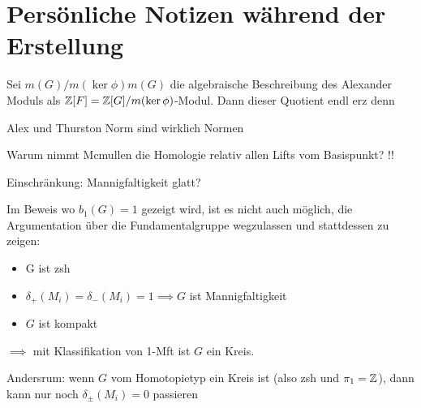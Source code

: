 
\section{Persönliche Notizen während der Erstellung}
	Sei $m(G)/m(\ker \phi)m(G)$ die algebraische Beschreibung des Alexander Moduls als $\mathbb{Z}[F]=\mathbb{Z}[G]/m(\ker \phi)$-Modul. Dann dieser Quotient endl erz denn

	Alex und Thurston Norm sind wirklich Normen 

	Warum nimmt Mcmullen die Homologie relativ allen Lifts vom Basispunkt?  !!

	Einschränkung: Mannigfaltigkeit glatt?

	Im Beweis wo $b_1(G)=1$ gezeigt wird, ist es nicht auch möglich, die Argumentation über die Fundamentalgruppe wegzulassen und stattdessen zu zeigen:
	\begin{itemize}
		\item G ist zsh
		\item $\delta_+(M_i) = \delta_-(M_i)=1 \implies G$ ist Mannigfaltigkeit
		\item $G$ ist kompakt
	\end{itemize}
	$\implies$ mit Klassifikation von 1-Mft ist $G$ ein Kreis.

	Andersrum: wenn $G$ vom Homotopietyp ein Kreis ist (also zsh und $\pi_1=\mathbb{Z}$), dann kann nur noch $\delta_\pm(M_i)=0$ passieren